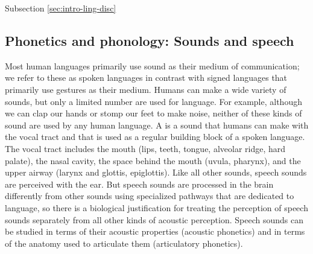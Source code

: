 Subsection \ref{sec:intro-ling-disc}

\subsection{Phonetics and phonology: Sounds and speech}\label{sec:intro-ling-phon}

Most human languages primarily use sound as their medium of communication; we refer to these as spoken languages in contrast with signed languages that primarily use gestures as their medium.
Humans can make a wide variety of sounds, but only a limited number are used for language.
For example, although we can clap our hands or stomp our feet to make noise, neither of these kinds of sound are used by any human language.
A  is a sound that humans can make with the vocal tract and that is used as a regular building block of a spoken language.
The vocal tract includes the mouth (lips, teeth, tongue, alveolar ridge, hard palate), the nasal cavity, the space behind the mouth (uvula, pharynx), and the upper airway (larynx and glottis, epiglottis).
Like all other sounds, speech sounds are perceived with the ear.
But speech sounds are processed in the brain differently from other sounds using specialized pathways that are dedicated to language, so there is a biological justification for treating the perception of speech sounds separately from all other kinds of acoustic perception.
Speech sounds can be studied in terms of their acoustic properties (acoustic phonetics) and in terms of the anatomy used to articulate them (articulatory phonetics).

